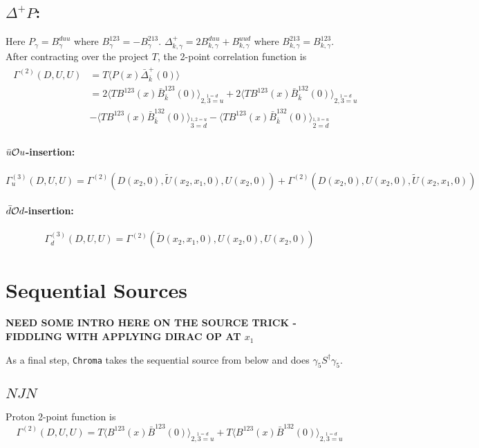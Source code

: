\documentclass[12pt]{article}
\begin{document}
\subsection{$\Delta^+ P$:}
Here $P_\gamma = B^{duu}_\gamma$ where $B^{123}_\gamma = -B^{213}_\gamma$.
$\Delta^+_{k,\gamma} = 2 B^{duu}_{k,\gamma} + B^{uud}_{k,\gamma}$ 
where $B^{213}_{k,\gamma}=B^{123}_{k,\gamma}$. 
After contracting over the project $T$, the 2-point correlation function is
%
\begin{gather*}
\begin{split}
\Gamma^{(2)}(D,U,U) & = T \langle P(x) \bar{\Delta}^+_{\bar{k}}(0)\rangle\\
 &= 2\langle T B^{123}(x) \bar{B}^{123}_{\bar{k}}(0)\rangle_{\stackrel{1=d}{2,3=u}}
  + 2\langle T B^{123}(x) \bar{B}^{132}_{\bar{k}}(0)\rangle_{\stackrel{1=d}{2,3=u}}\\
 &-  \langle T B^{123}(x) \bar{B}^{132}_{\bar{k}}(0)\rangle_{\stackrel{1,2=u}{3=d}}
  -  \langle T B^{123}(x) \bar{B}^{132}_{\bar{k}}(0)\rangle_{\stackrel{1,3=u}{2=d}}
\end{split}
\end{gather*}

\paragraph{$\bar{u}{\cal O}u$-insertion:}
\[
\Gamma^{(3)}_u(D,U,U) = \Gamma^{(2)}(D(x_2,0),\widetilde{U}(x_2,x_1,0),U(x_2,0))
 +  \Gamma^{(2)}(D(x_2,0),U(x_2,0),\widetilde{U}(x_2,x_1,0))
\]

\paragraph{$\bar{d}{\cal O}d$-insertion:}
\[
\Gamma^{(3)}_d(D,U,U) = \Gamma^{(2)}(\widetilde{D}(x_2,x_1,0),U(x_2,0),U(x_2,0))
\]


\newpage

\section{Sequential Sources}

{\bf NEED SOME INTRO HERE ON THE SOURCE TRICK - FIDDLING WITH APPLYING
DIRAC OP AT $x_1$}

As a final step, \verb|Chroma| takes the sequential source from below and
does  $\gamma_5 S^\dagger \gamma_5$.

\subsection{$N J N$}
Proton 2-point function is
\[
\Gamma^{(2)}(D,U,U) 
  = T \langle B^{123}(x) \bar{B}^{123}(0)\rangle_{\stackrel{1=d}{2,3=u}}
  + T \langle B^{123}(x) \bar{B}^{132}(0)\rangle_{\stackrel{1=d}{2,3=u}}
\]
\end{document}
